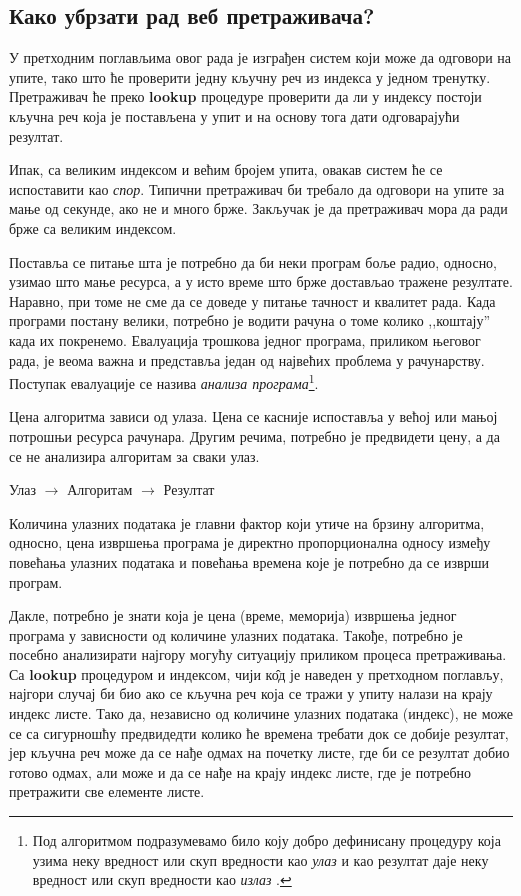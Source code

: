\subsection{Како убрзати рад веб претраживача?}

У претходним поглављима овог рада је изграђен систем који може да одговори на упите, тако што ће проверити једну кључну реч из индекса у једном тренутку. Претраживач ће преко \textbf{lookup} процедуре проверити да ли у индексу постоји кључна реч која је постављена у упит и на основу тога дати одговарајући резултат.

Ипак, са великим индексом и већим бројем упита, овакав систем ће се испоставити као \emph{спор}. Типични претраживач би требало да одговори на упите за мање од секунде, ако не и много брже. Закључак је да претраживач мора да ради брже са великим индексом.

Поставља се питање шта је потребно да би неки програм боље радио, односно,
узимао што мање ресурса, а у исто време што брже достављао тражене резултате.
Наравно, при томе не сме да се доведе у питање тачност и квалитет рада. Када
програми постану велики, потребно је водити рачуна о томе колико ,,коштају''
када их покренемо. Евалуација трошкова једног програма, приликом његовог рада, је
веома важна и представља један од највећих проблема у рачунарству. Поступак
евалуације се назива \emph{анализа програма}\footnote{Под алгоритмом подразумевамо било коју
добро дефинисану процедуру која узима неку вредност или скуп вредности као
\emph{улаз} и као резултат даје неку вредност или скуп вредности као
\emph{излаз} \cite{cormen2001introduction}.}.

Цена алгоритма зависи од улаза. Цена се касније испоставља у већој или
мањој потрошњи ресурса рачунара.
Другим речима, потребно је предвидети цену, а да се не анализира алгоритам за сваки улаз.

Улаз $\longrightarrow$ Алгоритам $\longrightarrow$ Резултат


Количина улазних података је главни фактор који утиче на брзину алгоритма,
односно, цена извршења програма је директно пропорционална односу између повећања улазних података и повећања времена које је потребно да се изврши програм.

Дакле, потребно је знати која је цена (време, меморија) извршења једног програма
у зависности од количине улазних података. Такође, потребно је посебно
анализирати најгору могућу ситуацију приликом процеса претраживања. Са
\textbf{lookup} процедуром и индексом, чији к\^{о}д је наведен у претходном поглављу, најгори случај би био ако се кључна реч која се тражи у упиту налази на крају индекс листе. Тако да, независно од количине улазних података (индекс), не може се са сигурношћу предвидедти колико ће времена требати док се добије резултат, јер кључна реч може да се нађе одмах на почетку листе, где би се резултат добио готово одмах, али може и да се нађе на крају индекс листе, где је потребно претражити све елементе листе.

